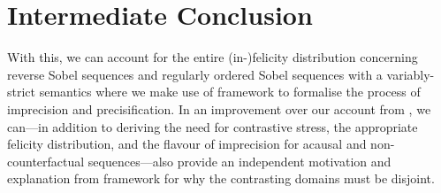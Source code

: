 \section{Intermediate Conclusion}
With this, we can account for the entire (in-)felicity distribution concerning reverse Sobel sequences and regularly ordered Sobel sequences with a variably-strict semantics where we make use of  framework to formalise the process of imprecision and precisification. In an improvement over our account from , we can---in addition to deriving the need for contrastive stress, the appropriate felicity distribution, and the flavour of imprecision for acausal and non-counterfactual sequences---also provide an independent motivation and explanation from  framework for why the contrasting domains must be disjoint.

